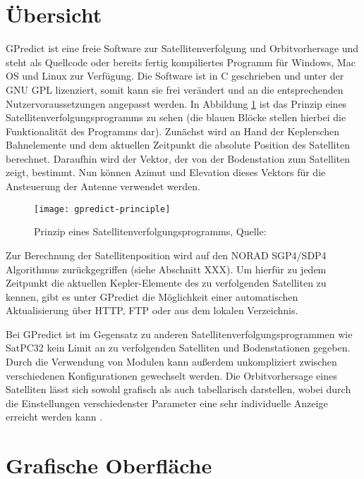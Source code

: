 \section{Übersicht}

GPredict ist eine freie Software zur Satellitenverfolgung und Orbitvorhersage und steht als Quellcode oder bereits fertig kompiliertes Programm für Windows, Mac OS und Linux zur Verfügung. Die Software ist in C geschrieben und unter der GNU \ac{GPL} lizenziert, somit kann sie frei verändert und an die entsprechenden Nutzervoraussetzungen angepasst werden.\newpar
In Abbildung \ref{fig:gpredict-principle} ist das Prinzip eines Satellitenverfolgungsprogramms zu sehen (die blauen Blöcke stellen hierbei die Funktionalität des Programms dar). Zunächst wird an Hand der Keplerschen Bahnelemente und dem aktuellen Zeitpunkt die absolute Position des Satelliten berechnet. Daraufhin wird der Vektor, der von der Bodenstation zum Satelliten zeigt, bestimmt. Nun können Azimut und Elevation dieses Vektors für die Ansteuerung der Antenne verwendet werden.

\begin{figure}[h]
	\centering
	\texttt{[image: gpredict-principle]}
	\caption{Prinzip eines Satellitenverfolgungsprogramms, Quelle: \cite{gpredictmanual}}
	\label{fig:gpredict-principle} 
\end{figure}

Zur Berechnung der Satellitenposition wird auf den NORAD SGP4/SDP4 Algorithmus zurückgegriffen (siehe Abschnitt XXX). Um hierfür zu jedem Zeitpunkt die aktuellen Kepler-Elemente des zu verfolgenden Satelliten zu kennen, gibt es unter GPredict die Möglichkeit einer automatischen Aktualisierung über HTTP, FTP oder aus dem lokalen Verzeichnis.

\clearpage

Bei GPredict ist im Gegensatz zu anderen Satellitenverfolgungsprogrammen wie SatPC32 kein Limit an zu verfolgenden Satelliten und Bodenstationen gegeben. Durch die Verwendung von Modulen kann außerdem unkompliziert zwischen verschiedenen Konfigurationen gewechselt werden. Die Orbitvorhersage eines Satelliten lässt sich sowohl grafisch als auch tabellarisch darstellen, wobei durch die Einstellungen verschiedenster Parameter eine sehr individuelle Anzeige erreicht werden kann \cite{gpredictsource}.

\section{Grafische Oberfläche}

